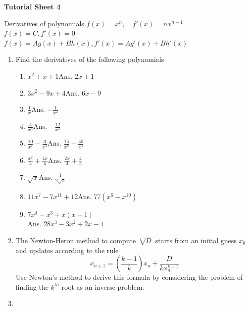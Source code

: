 \documentclass[11pt,a4paper,titlepage,oneside,openany]{article}
\numberwithin{equation}{section}
\numberwithin{algorithm}{section}
\numberwithin{figure}{section}
\numberwithin{table}{section}
\begin{document}
\begin{landscape}
\begin{enumerate}
\end{enumerate}

\end{landscape}

\pagebreak

\begin{center}
  \textbf{Tutorial Sheet 4}
\end{center}

Derivatives of polynomials 
$f(x)=x^n,\quad  f'(x)=n x^{n-1}$ \qquad
$f(x)=C,  f'(x)=0$\\
$f(x)=A g(x) + B h(x),  f'(x)=A g'(x) + B h'(x)$
\begin{enumerate}
\item Find the derivatives of the following polynomials
  \begin{multicols}{2}
    \begin{enumerate}
    \item $x^2+x+1$\hfill Ans. $2x+1$
    \item $3x^2-9x+4$\hfill Ans. $6x-9$
    \item $\frac{1}{x}$\hfill Ans. $-\frac{1}{x^2}$
    \item $\frac{4}{x^3}$\hfill Ans. $-\frac{12}{x^4}$
    \item $\frac{10}{x^4}-\frac{3}{x^5}$\hfill Ans. $\frac{15}{x^6}-\frac{40}{x^5}$
    \item $\frac{x^2}{3}+\frac{4x}{5}$\hfill Ans. $\frac{2x}{3}+\frac{4}{5}$
    \item $\sqrt{x}$\hfill Ans. $\frac{1}{2\sqrt{x}}$
    \item $11x^7-7x^{11}+12$\hfill Ans. $77(x^6-x^{10})$
    \item $7x^4-x^3+x(x-1)$ \\ \hfill Ans. $28x^3-3x^2+2x-1$
    \end{enumerate}
  \end{multicols}

\item
  The Newton-Heron method to compute $\sqrt[k]{D}$ starts from an initial guess $x_0$ and updates according to the rule
  \begin{equation*}
    x_{n+1}= \left( \frac{k-1}{k}\right)x_n + \frac{D}{k x_n^{k-1}}
  \end{equation*}
  Use Newton's method to derive this formula by considering the problem of finding the $k^{th}$ root as an inverse problem.

\item 
\end{enumerate}
\end{document}
